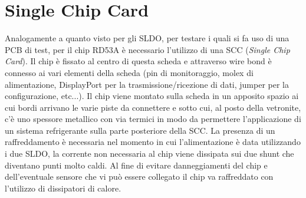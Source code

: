 \section{Single Chip Card}
Analogamente a quanto visto per gli SLDO, per  testare i quali si fa uso di una PCB di test, per il chip RD53A è necessario l'utilizzo di una SCC (\textit{Single Chip Card}). 
Il chip è fissato al centro di questa scheda e attraverso wire bond è connesso ai vari elementi della scheda (pin di monitoraggio, molex di alimentazione, DisplayPort per la trasmissione/ricezione di dati, jumper per la configurazione, etc...). 
Il chip viene montato sulla scheda in un apposito spazio ai cui bordi arrivano le varie piste da connettere e sotto cui, al posto della vetronite, c'è uno spessore metallico con via termici in modo da permettere l'applicazione di un sistema refrigerante sulla parte posteriore della SCC. 
La presenza di un raffreddamento è necessaria nel momento in cui l'alimentazione è data utilizzando i due SLDO, la corrente non necessaria al chip viene dissipata sui due shunt che diventano punti molto caldi. 
Al fine di evitare danneggiamenti del chip e dell'eventuale sensore che vi può essere collegato il chip va raffreddato con l'utilizzo di dissipatori di calore. 

